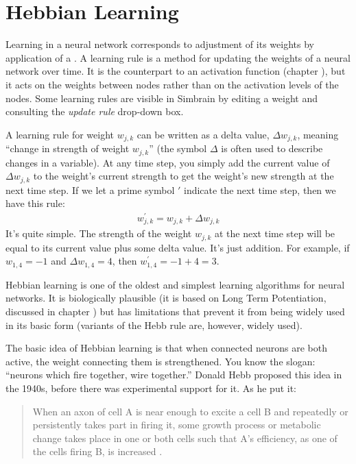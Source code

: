 \section{Hebbian Learning}


Learning in a neural network corresponds to adjustment of its weights by application of a . A learning rule is a method for updating the weights of a neural network over time. It is the counterpart to an activation function (chapter ), but it acts on the weights between nodes rather than on the activation levels of the nodes.  Some learning rules are visible in Simbrain by editing a weight and consulting the \emph{update  rule} drop-down box.

A learning rule for weight $w_{j,k}$  can be written as a delta value,
$\Delta w_{j,k}$, meaning ``change in strength of weight $w_{j,k}$'' (the symbol $\Delta$ is often used to describe changes in a variable). At any
time step, you simply add the current value of $\Delta w_{j,k}$ to the weight's 
current strength to get the weight's new strength at the next time step. If we let a prime symbol $\prime$ indicate the next time step, then we have this rule:
\begin{eqnarray*}
w^\prime_{j,k} = w_{j,k} + \Delta w_{j,k}
\end{eqnarray*}
It's quite simple. The strength of the weight $w_{j,k}$ at the next time step will be equal to its current value plus some delta value. It's just addition. For example, if $w_{1,4} =-1$ and $\Delta w_{1,4} = 4$, then $w^\prime_{1,4}  = -1 + 4 = 3$. 

Hebbian learning is one of the oldest and simplest learning algorithms for neural networks. It is biologically plausible (it is based on Long Term Potentiation, discussed in chapter ) but has limitations that prevent it from being widely used in its basic form (variants of the Hebb rule are, however, widely used). 

The basic idea of Hebbian learning is that when connected neurons are both active, the weight connecting them is strengthened. You know the slogan: ``neurons which fire  together, wire together.'' Donald Hebb proposed this idea in the 1940s, before there was experimental  support for it. As he put it:
\begin{quote}
When an axon of cell A is near enough to excite a cell B and repeatedly or persistently takes part in firing it, some growth process or metabolic change takes place in one or both cells such that A's efficiency, as one of the cells firing B, is increased \cite{hebb2005organization}.
\end{quote}


